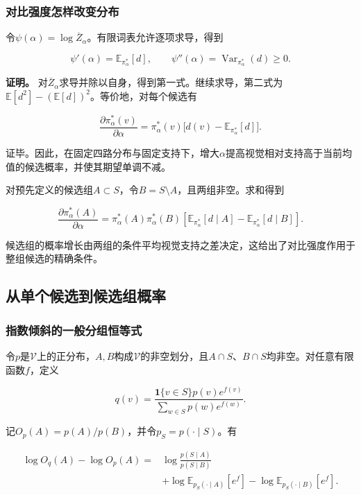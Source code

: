 \subsubsection{对比强度怎样改变分布}\label{ux5bf9ux6bd4ux5f3aux5ea6ux600eux6837ux6539ux53d8ux5206ux5e03}

令\(\psi(\alpha)=\log\overline Z_\alpha\)。有限词表允许逐项求导，得到

\[
\psi'(\alpha)=\mathbb E_{\pi_\alpha^*}[d],\qquad
\psi''(\alpha)=\operatorname{Var}_{\pi_\alpha^*}(d)\geq0.
\tag{D.30}
\]

\textbf{证明。} 对\(\overline Z_\alpha\)求导并除以自身，得到第一式。继续求导，第二式为\(\mathbb E[d^2]-(\mathbb E[d])^2\)。等价地，对每个候选有

\[
\frac{\partial\pi_\alpha^*(v)}{\partial\alpha}
=\pi_\alpha^*(v)\big[d(v)-\mathbb E_{\pi_\alpha^*}[d]\big].
\tag{D.31}
\]

证毕。因此，在固定四路分布与固定支持下，增大\(\alpha\)提高视觉相对支持高于当前均值的候选概率，并使其期望单调不减。

对预先定义的候选组\(A\subset S\)，令\(B=S\setminus A\)，且两组非空。求和得到

\[
\frac{\partial\pi_\alpha^*(A)}{\partial\alpha}
=\pi_\alpha^*(A)\pi_\alpha^*(B)
\left[\mathbb E_{\pi_\alpha^*}[d\mid A]-\mathbb E_{\pi_\alpha^*}[d\mid B]\right].
\tag{D.32}
\]

候选组的概率增长由两组的条件平均视觉支持之差决定，这给出了对比强度作用于整组候选的精确条件。

\subsection{从单个候选到候选组概率}\label{ux4eceux5355ux4e2aux5019ux9009ux5230ux5019ux9009ux7ec4ux6982ux7387}

\subsubsection{指数倾斜的一般分组恒等式}\label{ux6307ux6570ux503eux659cux7684ux4e00ux822cux5206ux7ec4ux6052ux7b49ux5f0f}

令\(p\)是\(\mathcal V\)上的正分布，\(A,B\)构成\(\mathcal V\)的非空划分，且\(A\cap S\)、\(B\cap S\)均非空。对任意有限函数\(f\)，定义

\[
q(v)=\frac{\mathbf1\{v\in S\}p(v)e^{f(v)}}{\sum_{w\in S}p(w)e^{f(w)}}.
\tag{D.33}
\]

记\(O_p(A)=p(A)/p(B)\)，并令\(p_S=p(\cdot\mid S)\)。有

\[
\boxed{
\begin{aligned}
\log O_q(A)-\log O_p(A)
={}&\log\frac{p(S\mid A)}{p(S\mid B)}\\
&+\log\mathbb E_{p_S(\cdot\mid A)}[e^f]
-\log\mathbb E_{p_S(\cdot\mid B)}[e^f].
\end{aligned}}
\tag{D.34}
\]

